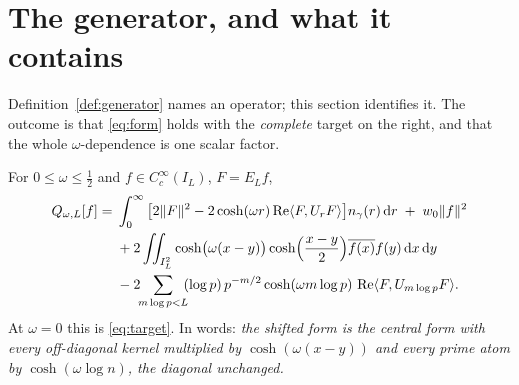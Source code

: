 \section{The generator, and what it contains}\label{sec:generator}

Definition~\ref{def:generator} names an operator; this section identifies it. The
outcome is that \eqref{eq:form} holds with the \emph{complete} target on the right,
and that the whole $\omega$-dependence is one scalar factor.

\begin{theorem}\label{thm:kernel}
For $0\leq\omega\leq\frac12$ and $f\in C_c^\infty(I_L)$, $F=E_Lf$,
\begin{align}
 Q_{\omega,L}[f]
 ={}&\int_0^\infty\big[2\lVert F\rVert^2-2\cosh(\omega r)\operatorname{Re}\langle F,U_rF\rangle\big]
      n_{\gamma}(r)\,\mathrm d r
   \;+\;w_0\lVert f\rVert^2 \notag\\
  &+2\iint_{I_L^2}\cosh\!\big(\omega(x-y)\big)
      \cosh\!\Big(\frac{x-y}2\Big)\overline{f(x)}f(y)\,\mathrm d x\,\mathrm d y \notag\\
  &-2\!\!\sum_{m\log p<L}\!\!(\log p)\,p^{-m/2}\cosh(\omega m\log p)\,
      \operatorname{Re}\langle F,U_{m\log p}F\rangle .
 \label{eq:shifted-target}
\end{align}
At $\omega=0$ this is \eqref{eq:target}. In words: \emph{the shifted form is the
central form with every off-diagonal kernel multiplied by $\cosh(\omega(x-y))$
and every prime atom by $\cosh(\omega\log n)$, the diagonal unchanged.}
\end{theorem}

